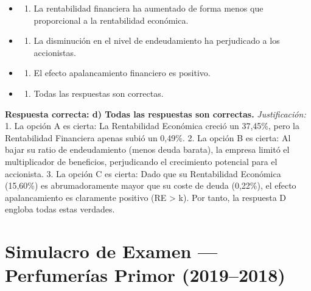 \documentclass[12pt]{book} %
\providecommand{\tightlist}{%
  \setlength{\itemsep}{0pt}\setlength{\parskip}{0pt}}
\begin{document}
\begin{itemize}
\item
  \begin{enumerate}
  \def\labelenumi{\alph{enumi})}
  \tightlist
  \item
    La rentabilidad financiera ha aumentado de forma menos que
    proporcional a la rentabilidad económica.
  \end{enumerate}
\item
  \begin{enumerate}
  \def\labelenumi{\alph{enumi})}
  \setcounter{enumi}{1}
  \tightlist
  \item
    La disminución en el nivel de endeudamiento ha perjudicado a los
    accionistas.
  \end{enumerate}
\item
  \begin{enumerate}
  \def\labelenumi{\alph{enumi})}
  \setcounter{enumi}{2}
  \tightlist
  \item
    El efecto apalancamiento financiero es positivo.
  \end{enumerate}
\item
  \begin{enumerate}
  \def\labelenumi{\alph{enumi})}
  \setcounter{enumi}{3}
  \tightlist
  \item
    Todas las respuestas son correctas.
  \end{enumerate}
\end{itemize}

\textbf{Respuesta correcta: d) Todas las respuestas son correctas.}
\emph{Justificación:} 1. La opción A es cierta: La Rentabilidad
Económica creció un 37,45\%, pero la Rentabilidad Financiera apenas
subió un 0,49\%. 2. La opción B es cierta: Al bajar su ratio de
endeudamiento (menos deuda barata), la empresa limitó el multiplicador
de beneficios, perjudicando el crecimiento potencial para el accionista.
3. La opción C es cierta: Dado que su Rentabilidad Económica (15,60\%)
es abrumadoramente mayor que su coste de deuda (0,22\%), el efecto
apalancamiento es claramente positivo (RE \textgreater{} k). Por tanto,
la respuesta D engloba todas estas verdades.

\hypertarget{simulacro-de-examen-perfumeruxedas-primor-20192018}{%
\chapter{Simulacro de Examen --- Perfumerías Primor
(2019--2018)}\label{simulacro-de-examen-perfumeruxedas-primor-20192018}}
\end{document}
